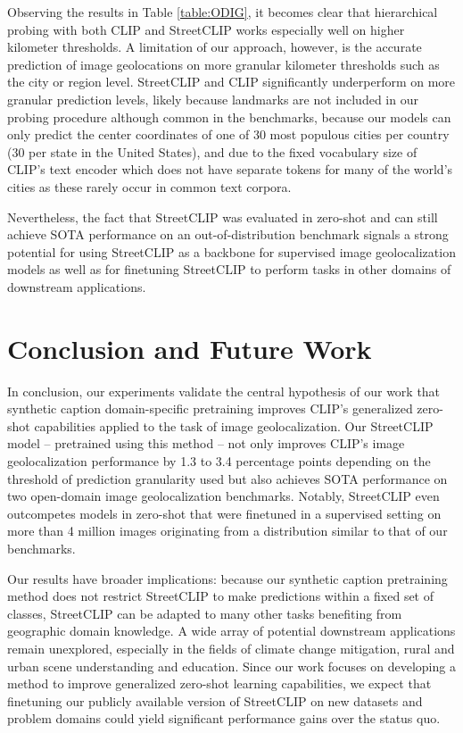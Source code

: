 \documentclass{article}
\begin{document}
Observing the results in Table \ref{table:ODIG}, it becomes clear that hierarchical probing with both CLIP and StreetCLIP works especially well on higher kilometer thresholds. A limitation of our approach, however, is the accurate prediction of image geolocations on more granular kilometer thresholds such as the city or region level. StreetCLIP and CLIP significantly underperform on more granular prediction levels, likely because landmarks are not included in our probing procedure although common in the benchmarks, because our models can only predict the center coordinates of one of 30 most populous cities per country (30 per state in the United States), and due to the fixed vocabulary size of CLIP's text encoder which does not have separate tokens for many of the world's cities as these rarely occur in common text corpora.

Nevertheless, the fact that StreetCLIP was evaluated in zero-shot and can still achieve SOTA performance on an out-of-distribution benchmark signals a strong potential for using StreetCLIP as a backbone for supervised image geolocalization models as well as for finetuning StreetCLIP to perform tasks in other domains of downstream applications. 

\section{Conclusion and Future Work}

In conclusion, our experiments validate the central hypothesis of our work that synthetic caption domain-specific pretraining improves CLIP's generalized zero-shot capabilities applied to the task of image geolocalization. Our StreetCLIP model – pretrained using this method – not only improves CLIP's image geolocalization performance by 1.3 to 3.4 percentage points depending on the threshold of prediction granularity used but also achieves SOTA performance on two open-domain image geolocalization benchmarks. Notably, StreetCLIP even outcompetes models in zero-shot that were finetuned in a supervised setting on more than 4 million images originating from a distribution similar to that of our benchmarks. 

Our results have broader implications: because our synthetic caption pretraining method does not restrict StreetCLIP to make predictions within a fixed set of classes, StreetCLIP can be adapted to many other tasks benefiting from geographic domain knowledge. A wide array of potential downstream applications remain unexplored, especially in the fields of climate change mitigation, rural and urban scene understanding and education. Since our work focuses on developing a method to improve generalized zero-shot learning capabilities, we expect that finetuning our publicly available version of StreetCLIP on new datasets and problem domains could yield significant performance gains over the status quo. 
\end{document}
